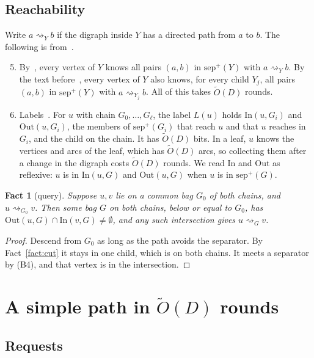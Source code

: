 \documentclass[11pt]{article}
\newtheorem{fact}[theorem]{Fact}
\theoremstyle{definition}
\theoremstyle{remark}
\theoremstyle{plain}
\newcommand{\Ot}{\tilde O}
\newcommand{\sep}{\mathrm{sep}}
\newcommand{\In}{\mathrm{In}}
\newcommand{\Out}{\mathrm{Out}}
\newcommand{\reach}{\rightsquigarrow}
\begin{document}
\subsection{Reachability}\label{sec:reach}

Write $a\reach_Y b$ if the digraph inside $Y$ has a directed path from $a$ to $b$. The following is
from~\cite{P20}.
\begin{enumerate}[(B1)]\setcounter{enumi}{4}
\item By~\cite[Lemma 16]{P20}, every vertex of $Y$ knows all pairs $(a,b)$ in $\sep^+(Y)$ with $a\reach_Y b$.
By the text before~\cite[Claim 15]{P20}, every vertex of $Y$ also knows, for every child $Y_j$, all pairs
$(a,b)$ in $\sep^+(Y)$ with $a\reach_{Y_j}b$. All of this takes $\Ot(D)$ rounds.
\item Labels~\cite[Step 2]{P20}. For $u$ with chain $G_0,\dots,G_\ell$, the label $L(u)$ holds $\In(u,G_i)$
and $\Out(u,G_i)$, the members of $\sep^+(G_i)$ that reach $u$ and that $u$ reaches in $G_i$, and the
child on the chain. It has $\Ot(D)$ bits. In a leaf, $u$ knows the vertices and arcs of the leaf, which has
$\Ot(D)$ arcs, so collecting them after a change in the digraph costs $\Ot(D)$ rounds. We read $\In$ and $\Out$ as reflexive: $u$ is in
$\In(u,G)$ and $\Out(u,G)$ when $u$ is in $\sep^+(G)$.
\end{enumerate}

\begin{fact}[query]\label{fact:query}
Suppose $u,v$ lie on a common bag $G_0$ of both chains, and $u\reach_{G_0}v$. Then some bag $G$ on both chains,
below or equal to $G_0$, has $\Out(u,G)\cap\In(v,G)\neq\emptyset$, and any such intersection gives $u\reach_G v$.
\end{fact}
\begin{proof}
Descend from $G_0$ as long as the path avoids the separator. By Fact~\ref{fact:cut} it stays in one child, which
is on both chains. It meets a separator by (B4), and that vertex is in the intersection.
\end{proof}

\section{A simple path in \texorpdfstring{$\Ot(D)$}{O(D)} rounds}\label{sec:path}

\subsection{Requests}
\end{document}
